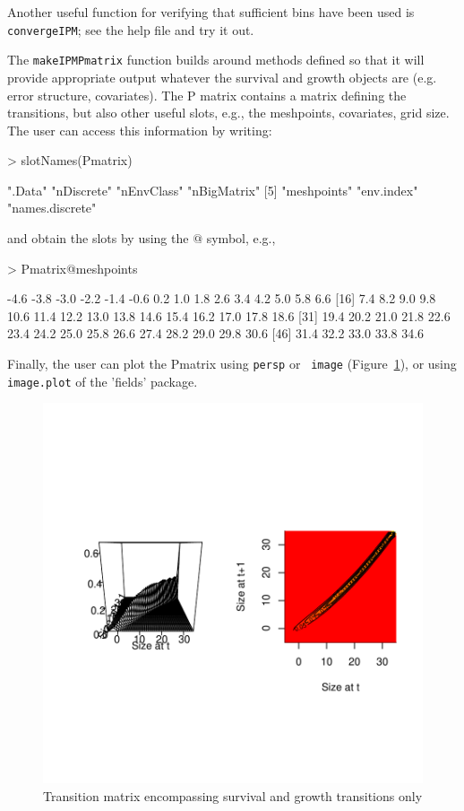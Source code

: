 \documentclass{article}
\begin{document}
Another useful function for verifying that sufficient bins have been used
is {\tt convergeIPM}; see the help file and try it out.

The {\tt makeIPMPmatrix} function builds around methods defined so that it
will provide appropriate output whatever the survival and growth objects are
(e.g. error structure, covariates). The P matrix contains a matrix defining the
transitions, but also other useful slots, e.g., the meshpoints, covariates,
grid size. The user can access this information by writing:
\begin{Schunk}
\begin{Sinput}
> slotNames(Pmatrix)
\end{Sinput}
\begin{Soutput}
[1] ".Data"          "nDiscrete"      "nEnvClass"      "nBigMatrix"    
[5] "meshpoints"     "env.index"      "names.discrete"
\end{Soutput}
\end{Schunk}
and obtain the slots by using the $@$ symbol, e.g., 
\begin{Schunk}
\begin{Sinput}
> Pmatrix@meshpoints
\end{Sinput}
\begin{Soutput}
 [1] -4.6 -3.8 -3.0 -2.2 -1.4 -0.6  0.2  1.0  1.8  2.6  3.4  4.2  5.0  5.8  6.6
[16]  7.4  8.2  9.0  9.8 10.6 11.4 12.2 13.0 13.8 14.6 15.4 16.2 17.0 17.8 18.6
[31] 19.4 20.2 21.0 21.8 22.6 23.4 24.2 25.0 25.8 26.6 27.4 28.2 29.0 29.8 30.6
[46] 31.4 32.2 33.0 33.8 34.6
\end{Soutput}
\end{Schunk}
Finally, the user can plot the Pmatrix using {\tt persp} or {\tt
  image} (Figure~\ref{fig:two}), or using {\tt image.plot} of the 'fields' package. 
\begin{figure}
\begin{center}
\includegraphics{IPMpack_Vignette-fig2}
\end{center}
\caption{Transition matrix encompassing survival and growth transitions only}
\label{fig:two}
\end{figure}
\end{document}

